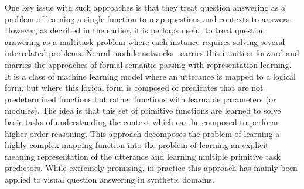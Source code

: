 \documentclass[main.tex]{subfiles}
\begin{document}
One key issue with such approaches is that they treat question answering as a problem of learning a single function to map questions and contexts to answers.  However, as decribed in the earlier, it is perhaps useful to treat question answering as a multitask problem where each instance requires solving several interrelated problems.
Neural module networks~ carries this intuition forward and marries the approaches of formal semantic parsing with representation learning.  It is a class of machine learning model where an utterance is mapped to a logical form, but where this logical form is composed of predicates that are not predetermined functions but rather functions with learnable parameters (or modules).  The idea is that this set of primitive functions are learned to solve basic tasks of understanding the context which can be composed to perform higher-order reasoning. This approach decomposes the problem of learning a highly complex mapping function into the problem of learning an explicit meaning representation of the utterance and learning multiple primitive task predictors.  While extremely promising, in practice this approach has mainly been applied to visual question answering in synthetic domains.
\end{document}
